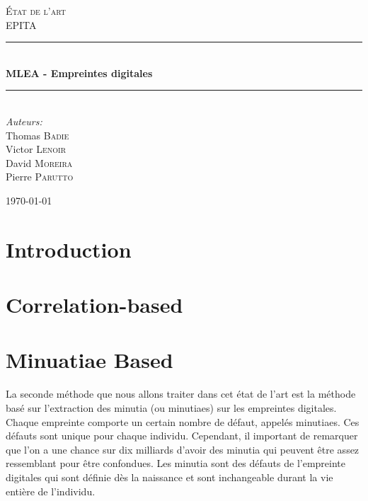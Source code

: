 \documentclass{report}
\newcommand{\HRule}{\rule{\linewidth}{0.5mm}}
\begin{document}
\begin{titlepage}

\begin{center}

\textsc{\LARGE \'Etat de l'art}\\[1.5cm]

\textsc{\Large EPITA}\\[0.5cm]

\HRule \\[0.4cm]
{ \huge \bfseries MLEA - Empreintes digitales}\\[0.4cm]

\HRule \\[1.5cm]

\large
\emph{Auteurs:}\\
Thomas \textsc{Badie}\\
Victor \textsc{Lenoir}\\
David \textsc{Moreira}\\
Pierre \textsc{Parutto}\\

\vfill

{\large \today}

\end{center}

\end{titlepage}
\newpage
\tableofcontents
\newpage

\chapter{Introduction}




\chapter{Correlation-based}
\chapter{Minuatiae Based}

La seconde méthode que nous allons traiter dans cet état de l'art est
la méthode basé sur l'extraction des minutia (ou minutiaes) sur les
empreintes digitales. Chaque empreinte comporte un certain nombre de
défaut, appelés minutiaes. Ces défauts sont unique pour chaque
individu. Cependant, il important de remarquer que l'on a une chance
sur dix milliards d'avoir des minutia qui peuvent être assez
ressemblant pour être confondues. Les minutia sont des défauts de
l'empreinte digitales qui sont définie dès la naissance et sont
inchangeable durant la vie entière de l'individu.
\end{document}
